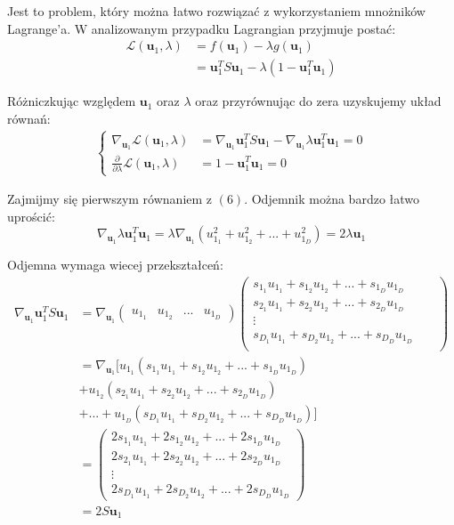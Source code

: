 \documentclass[oneside, eng]{mgr}
\newcommand{\bb}{\textbf}
\begin{document}
Jest to problem, który można łatwo rozwiązać z wykorzystaniem mnożników Lagrange'a. W analizowanym przypadku Lagrangian przyjmuje postać:
\begin{align*}
	\mathcal{L}(\bb{u}_1, \lambda) &= f(\bb{u}_1) - \lambda g(\bb{u}_1) \\
				&= \bb{u}_1^T S \bb{u}_1 - \lambda(1 - \bb{u}_1^T \bb{u}_1)
\end{align*}

Różniczkując względem $\bb{u}_1$ oraz $\lambda$ oraz przyrównując do zera uzyskujemy układ równań:
\begin{align}
\begin{cases}
	\nabla_{\bb{u}_1} \mathcal{L} (\bb{u}_1, \lambda) &= \nabla_{\bb{u}_1} \bb{u}_1^T S \bb{u}_1 - \nabla_{\bb{u}_1} \lambda \bb{u}_1^T \bb{u}_1 = 0 \\
	\frac{\partial}{\partial \lambda} \mathcal{L} (\bb{u}_1, \lambda) &= 1 - \bb{u}_1^T \bb{u}_1 = 0
\end{cases}
\end{align}

Zajmijmy się pierwszym równaniem z $(6)$. Odjemnik można bardzo łatwo uprościć:
\begin{equation}
	\nabla_{\bb{u}_1} \lambda \bb{u}_1^T \bb{u}_1 = \lambda \nabla_{\bb{u}_1} 
		(u_{1_1}^2 + u_{1_2}^2 + ... + u_{1_D}^2)
	 	= 2 \lambda \bb{u}_1
\end{equation}

Odjemna wymaga wiecej przekształceń:
\begin{align}
	\nabla_{\bb{u}_1} \bb{u}_1^T S \bb{u}_1 
	&= \nabla_{\bb{u}_1} 
	\left( \begin{array}{llll} u_{1_1} & u_{1_2} & ... & u_{1_D} \end{array} \right)
	\begin{pmatrix}
         s_{1_1} u_{1_1} + s_{1_2} u_{1_2} + ... + s_{1_D} u_{1_D}  \\
		 s_{2_1} u_{1_1} + s_{2_2} u_{1_2} + ... + s_{2_D} u_{1_D} && \\
		 \vdots     \\
		 s_{D_1} u_{1_1} + s_{D_2} u_{1_2} + ... + s_{D_D} u_{1_D} && \\
    \end{pmatrix} \\
    &= \nabla_{\bb{u}_1} [u_{1_1} (s_{1_1} u_{1_1} + s_{1_2} u_{1_2} + ... + s_{1_D} u_{1_D})  \\
    				&+ u_{1_2} (s_{2_1} u_{1_1} + s_{2_2} u_{1_2} + ... + s_{2_D} u_{1_D}) \nonumber \\
    				&+ ... + u_{1_D} (s_{D_1} u_{1_1} + s_{D_2} u_{1_2} + ... + s_{D_D} u_{1_D})] \nonumber \\
    &= \begin{pmatrix}
    	2 s_{1_1} u_{1_1} + 2 s_{1_2} u_{1_2} + ... + 2 s_{1_D} u_{1_D}  \\
    	2 s_{2_1} u_{1_1} + 2 s_{2_2} u_{1_2} + ... + 2 s_{2_D} u_{1_D}  \\
    	\vdots     \\
	    2 s_{D_1} u_{1_1} + 2 s_{D_2} u_{1_2} + ... + 2 s_{D_D} u_{1_D}
    \end{pmatrix} \\
    &= 2 S \bb{u}_1
\end{align}
\end{document}
